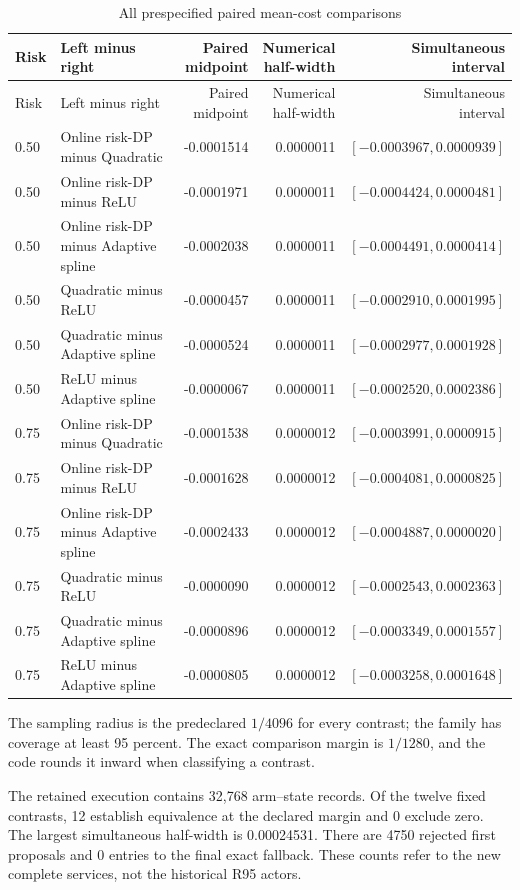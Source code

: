 \begin{longtable}{@{}l p{.24\linewidth} r r r@{}}
\caption{All prespecified paired mean-cost comparisons}\label{tab:pairs96}\\
\toprule Risk & Left minus right & \shortstack{Paired\\midpoint} & \shortstack{Numerical\\half-width} & \shortstack{Simultaneous\\interval}\\
\midrule\endfirsthead
\toprule Risk & Left minus right & \shortstack{Paired\\midpoint} & \shortstack{Numerical\\half-width} & \shortstack{Simultaneous\\interval}\\
\midrule\endhead
0.50 & Online risk-DP minus Quadratic & -0.0001514 & 0.0000011 & $[-0.0003967,0.0000939]$ \\
0.50 & Online risk-DP minus ReLU & -0.0001971 & 0.0000011 & $[-0.0004424,0.0000481]$ \\
0.50 & Online risk-DP minus Adaptive spline & -0.0002038 & 0.0000011 & $[-0.0004491,0.0000414]$ \\
0.50 & Quadratic minus ReLU & -0.0000457 & 0.0000011 & $[-0.0002910,0.0001995]$ \\
0.50 & Quadratic minus Adaptive spline & -0.0000524 & 0.0000011 & $[-0.0002977,0.0001928]$ \\
0.50 & ReLU minus Adaptive spline & -0.0000067 & 0.0000011 & $[-0.0002520,0.0002386]$ \\
0.75 & Online risk-DP minus Quadratic & -0.0001538 & 0.0000012 & $[-0.0003991,0.0000915]$ \\
0.75 & Online risk-DP minus ReLU & -0.0001628 & 0.0000012 & $[-0.0004081,0.0000825]$ \\
0.75 & Online risk-DP minus Adaptive spline & -0.0002433 & 0.0000012 & $[-0.0004887,0.0000020]$ \\
0.75 & Quadratic minus ReLU & -0.0000090 & 0.0000012 & $[-0.0002543,0.0002363]$ \\
0.75 & Quadratic minus Adaptive spline & -0.0000896 & 0.0000012 & $[-0.0003349,0.0001557]$ \\
0.75 & ReLU minus Adaptive spline & -0.0000805 & 0.0000012 & $[-0.0003258,0.0001648]$ \\
\bottomrule\end{longtable}\endgroup
\noindent The sampling radius is the predeclared $1/4096$ for every contrast; the family has coverage at least 95 percent. The exact comparison margin is $1/1280$, and the code rounds it inward when classifying a contrast.

The retained execution contains 32,768 arm--state records. Of the twelve fixed contrasts, 12 establish equivalence at the declared margin and 0 exclude zero. The largest simultaneous half-width is 0.00024531. There are 4750 rejected first proposals and 0 entries to the final exact fallback. These counts refer to the new complete services, not the historical R95 actors.
